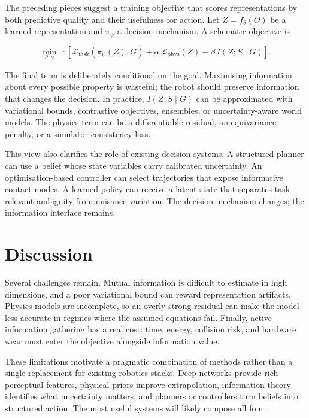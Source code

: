 \documentclass[11pt]{article}
\begin{document}
The preceding pieces suggest a training objective that scores representations
by both predictive quality and their usefulness for action. Let $Z=f_\theta(O)$
be a learned representation and $\pi_\psi$ a decision mechanism. A schematic
objective is

\begin{equation}
  \min_{\theta,\psi}\;
  \mathbb{E}\left[\mathcal{L}_{\mathrm{task}}(\pi_\psi(Z),G)
  + \alpha\,\mathcal{L}_{\mathrm{phys}}(Z)
  - \beta\,I(Z;S\mid G)\right].
  \label{eq:unified-loss}
\end{equation}

The final term is deliberately conditional on the goal. Maximising information
about every possible property is wasteful; the robot should preserve
information that changes the decision. In practice, $I(Z;S\mid G)$ can be
approximated with variational bounds, contrastive objectives, ensembles, or
uncertainty-aware world models. The physics term can be a differentiable
residual, an equivariance penalty, or a simulator consistency loss.

This view also clarifies the role of existing decision systems. A structured
planner can use a belief whose state variables carry calibrated uncertainty. An
optimisation-based controller can select trajectories that expose informative
contact modes. A learned policy can receive a latent state that separates
task-relevant ambiguity from nuisance variation. The decision mechanism
changes; the information interface remains.

\section{Discussion}
\label{sec:discussion}

Several challenges remain. Mutual information is difficult to estimate in high
dimensions, and a poor variational bound can reward representation artifacts.
Physics models are incomplete, so an overly strong residual can make the model
less accurate in regimes where the assumed equations fail. Finally, active
information gathering has a real cost: time, energy, collision risk, and
hardware wear must enter the objective alongside information value.

These limitations motivate a pragmatic combination of methods rather than a
single replacement for existing robotics stacks. Deep networks provide rich
perceptual features, physical priors improve extrapolation, information theory
identifies what uncertainty matters, and planners or controllers turn beliefs
into structured action. The most useful systems will likely compose all four.
\end{document}
